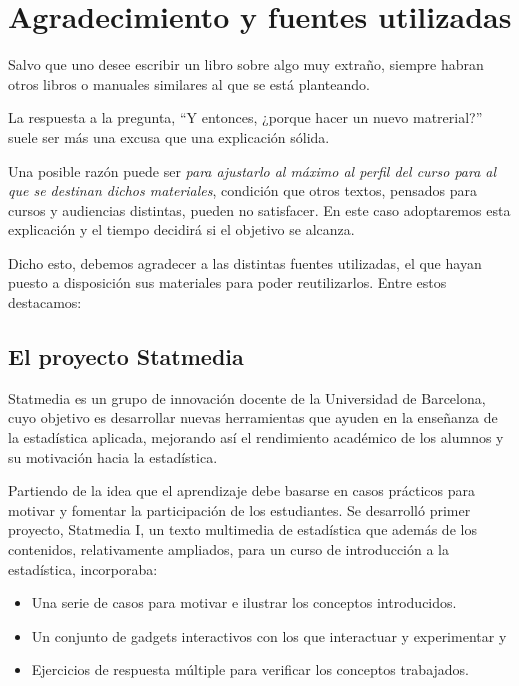\documentclass[
]{article}
\providecommand{\tightlist}{%
  \setlength{\itemsep}{0pt}\setlength{\parskip}{0pt}}
\begin{document}
\section*{Agradecimiento y fuentes utilizadas}\label{agradecimiento-y-fuentes-utilizadas}

Salvo que uno desee escribir un libro sobre algo muy extraño, siempre habran otros libros o manuales similares al que se está planteando.

La respuesta a la pregunta, ``Y entonces, ¿porque hacer un nuevo matrerial?'' suele ser más una excusa que una explicación sólida.

Una posible razón puede ser \emph{para ajustarlo al máximo al perfil del curso para al que se destinan dichos materiales}, condición que otros textos, pensados para cursos y audiencias distintas, pueden no satisfacer. En este caso adoptaremos esta explicación y el tiempo decidirá si el objetivo se alcanza.

Dicho esto, debemos agradecer a las distintas fuentes utilizadas, el que hayan puesto a disposición sus materiales para poder reutilizarlos. Entre estos destacamos:

\subsection*{El proyecto Statmedia}\label{el-proyecto-statmedia}

Statmedia es un grupo de innovación docente de la Universidad de Barcelona, cuyo objetivo es desarrollar nuevas herramientas que ayuden en la enseñanza de la estadística aplicada, mejorando así el rendimiento académico de los alumnos y su motivación hacia la estadística.

Partiendo de la idea que el aprendizaje debe basarse en casos prácticos para motivar y fomentar la participación de los estudiantes. Se desarrolló primer proyecto, Statmedia I, un texto multimedia de estadística que además de los contenidos, relativamente ampliados, para un curso de introducción a la estadística, incorporaba:

\begin{itemize}
\tightlist
\item
  Una serie de casos para motivar e ilustrar los conceptos introducidos.
\item
  Un conjunto de gadgets interactivos con los que interactuar y experimentar y
\item
  Ejercicios de respuesta múltiple para verificar los conceptos trabajados.
\end{itemize}
\end{document}
